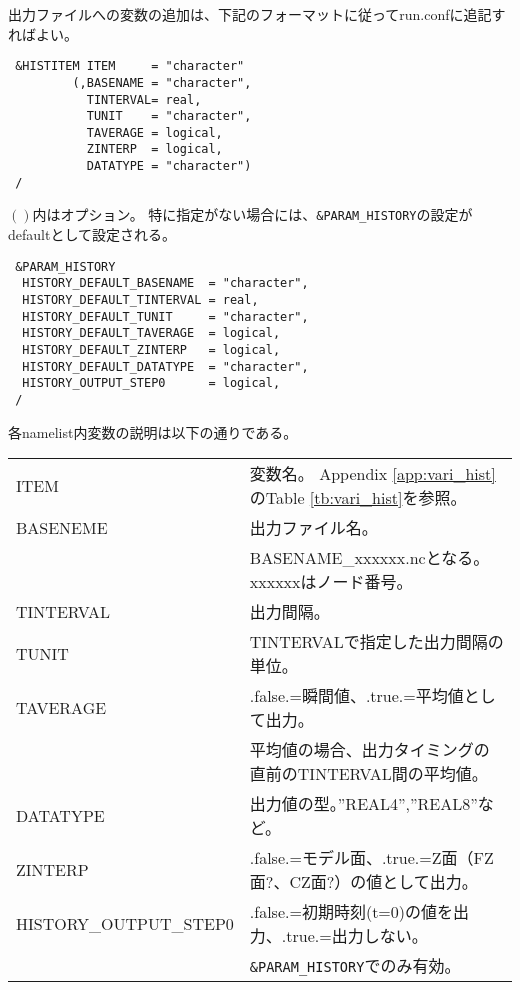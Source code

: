 出力ファイルへの変数の追加は、下記のフォーマットに従ってrun.confに追記すればよい。
\begin{verbatim}
 &HISTITEM ITEM     = "character"
         (,BASENAME = "character",
           TINTERVAL= real,
           TUNIT    = "character", 
           TAVERAGE = logical,
           ZINTERP  = logical, 
           DATATYPE = "character")
 /
\end{verbatim}
$\left( \right)$内はオプション。
特に指定がない場合には、\verb|&PARAM_HISTORY|の設定がdefaultとして設定される。
\begin{verbatim}
 &PARAM_HISTORY
  HISTORY_DEFAULT_BASENAME  = "character",
  HISTORY_DEFAULT_TINTERVAL = real,
  HISTORY_DEFAULT_TUNIT     = "character",
  HISTORY_DEFAULT_TAVERAGE  = logical,
  HISTORY_DEFAULT_ZINTERP   = logical,
  HISTORY_DEFAULT_DATATYPE  = "character",
  HISTORY_OUTPUT_STEP0      = logical,
 /
\end{verbatim}
各namelist内変数の説明は以下の通りである。\\
{\renewcommand\arraystretch{1.2}
\begin{tabular}{ll}
\hline
ITEM                   & 変数名。 Appendix \ref{app:vari_hist}のTable \ref{tb:vari_hist}を参照。\\
BASENEME               & 出力ファイル名。\\
                       & BASENAME\_xxxxxx.ncとなる。xxxxxxはノード番号。\\
TINTERVAL              & 出力間隔。\\
TUNIT                  & TINTERVALで指定した出力間隔の単位。\\
TAVERAGE               & .false.=瞬間値、.true.=平均値として出力。\\
                       & 平均値の場合、出力タイミングの直前のTINTERVAL間の平均値。\\
DATATYPE               & 出力値の型。''REAL4'',''REAL8''など。\\
ZINTERP                & .false.=モデル面、.true.=Z面（FZ面$?$、CZ面$?$）の値として出力。\\
HISTORY\_OUTPUT\_STEP0 & .false.=初期時刻(t=0)の値を出力、.true.=出力しない。\\
                       & \verb|&PARAM_HISTORY|でのみ有効。\\
\hline
\end{tabular}
}\\

